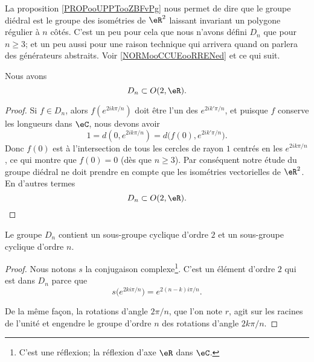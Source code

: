 \begin{normaltext}
	La proposition \ref{PROPooUPPTooZBFvPg} nous permet de dire que le groupe diédral est le groupe des isométries de \( \eR^2\) laissant invariant un polygone régulier à \( n\) côtés.
	C'est un peu pour cela que nous n'avons défini \( D_n\) que pour \( n\geq 3\); et un peu aussi pour une raison technique qui arrivera quand on parlera des générateurs abstraits. Voir \ref{NORMooCCUEooRRENed} et ce qui suit.
\end{normaltext}

\begin{lemma}       \label{LEMooCUVPooMZKnzo}
	Nous avons
	\begin{equation}
		D_n\subset O(2,\eR).
	\end{equation}
\end{lemma}

\begin{proof}
	Si \( f\in D_n\), alors \( f( e^{2ik\pi/n}) \) doit être l'un des \(  e^{2ik'\pi/n}\), et puisque \( f\) conserve les longueurs dans \( \eC\), nous devons avoir
	\begin{equation}
		1=d(0, e^{2ik\pi/n})=d\big( f(0), e^{2ik'\pi/n} \big).
	\end{equation}
	Donc \( f(0)\) est à l'intersection de tous les cercles de rayon \( 1\) centrés en les \(  e^{2ik\pi/n}\), ce qui montre que \( f(0)=0\) (dès que \( n\geq 3\)). Par conséquent notre étude du groupe diédral ne doit prendre en compte que les isométries vectorielles de \( \eR^2\). En d'autres termes
	\begin{equation}
		D_n\subset O(2,\eR).
	\end{equation}
\end{proof}

\begin{proposition}      \label{PROPooELOIooVJtuZN}
	Le groupe \( D_n\) contient un sous-groupe cyclique d'ordre \( 2\) et un sous-groupe cyclique d'ordre \( n\).
\end{proposition}

\begin{proof}
	Nous notons \( s\) la conjugaison complexe\footnote{C'est une réflexion; la réflexion d'axe \( \eR\) dans \( \eC\).}. C'est un élément d'ordre \( 2\) qui est dans \( D_n\) parce que
	\begin{equation}    \label{EqSUshknP}
		s\big(  e^{2ki\pi/n} \big)= e^{2(n-k)i\pi/n}.
	\end{equation}

	De la même façon, la rotations d'angle \(2\pi/n\), que l'on note \( r\), agit sur les racines de l'unité et engendre le groupe d'ordre \( n\) des rotations d'angle \(2 k\pi/n\).
\end{proof}

